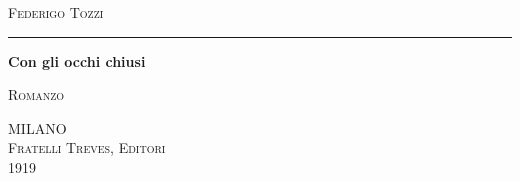 \documentclass[11pt,twoside,openright]{book}
\begin{document}
\frontmatter

\begin{titlepage}
    \centering
    \vspace*{1cm}
    
    {\Large\scshape Federigo Tozzi}
    
    \vspace{0.4cm}
    \rule{2cm}{0.4pt}
    \vspace{2cm}
    
    {\Huge\bfseries Con gli occhi chiusi}
    
    \vspace{0.8cm}
    {\large\scshape Romanzo}
    
    \vfill
    
    
    {\large MILANO}\\[0.2cm]
    {\large\scshape Fratelli Treves, Editori}\\[0.2cm]
    {\small 1919}
    
    \vspace*{1cm}
\end{titlepage}

\clearpage
\thispagestyle{empty}
\vspace*{\fill}
\end{document}
